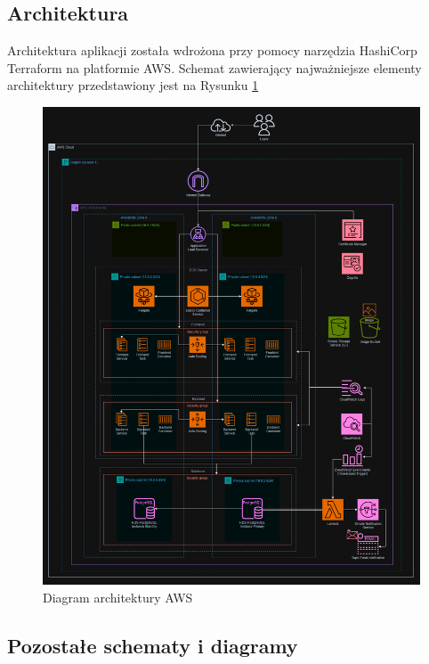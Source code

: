\documentclass[../main.tex]{subfiles}
\begin{document}
    \subsection{Architektura}
        Architektura aplikacji została wdrożona przy pomocy narzędzia HashiCorp Terraform na platformie AWS. Schemat zawierający najważniejsze elementy architektury przedstawiony jest na Rysunku \ref{fig:aws-architecture} 
        \begin{figure}[H]
            \centering
            \includegraphics[width=1.0\linewidth]{images/AWS-diagram.png}
            \caption{Diagram architektury AWS}
            \label{fig:aws-architecture}
        \end{figure}

    \FloatBarrier
    \subsection{Pozostałe schematy i diagramy}
\end{document}
